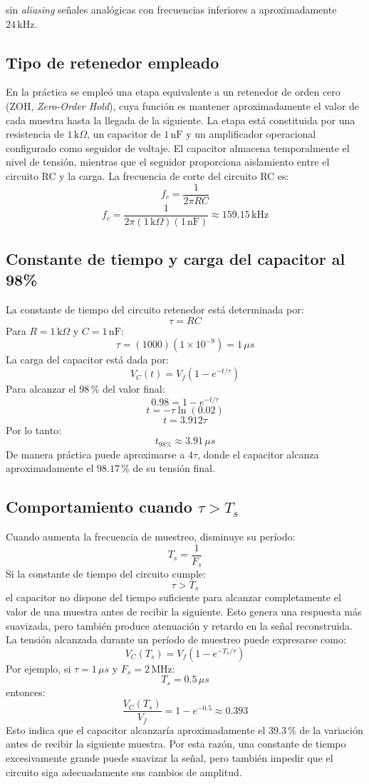 \documentclass[conference]{IEEEtran}
\begin{document}
sin \textit{aliasing} señales analógicas con frecuencias inferiores a aproximadamente $24\,\text{kHz}$. \subsection{Tipo de retenedor empleado} En la práctica se empleó una etapa equivalente a un retenedor de orden cero (ZOH, \textit{Zero-Order Hold}), cuya función es mantener aproximadamente el valor de cada muestra hasta la llegada de la siguiente. La etapa está constituida por una resistencia de $1\,\text{k}\Omega$, un capacitor de $1\,\text{nF}$ y un amplificador operacional configurado como seguidor de voltaje. El capacitor almacena temporalmente el nivel de tensión, mientras que el seguidor proporciona aislamiento entre el circuito RC y la carga. La frecuencia de corte del circuito RC es: \[ f_c=\frac{1}{2\pi RC} \] \[ f_c= \frac{1}{2\pi(1\,\text{k}\Omega)(1\,\text{nF})} \approx159.15\,\text{kHz} \] \subsection{Constante de tiempo y carga del capacitor al 98\%} La constante de tiempo del circuito retenedor está determinada por: \[ \tau=RC \] Para $R=1\,\text{k}\Omega$ y $C=1\,\text{nF}$: \[ \tau=(1000)(1\times10^{-9}) =1\,\mu s \] La carga del capacitor está dada por: \[ V_C(t)=V_f\left(1-e^{-t/\tau}\right) \] Para alcanzar el $98\,\%$ del valor final: \[ 0.98=1-e^{-t/\tau} \] \[ t=-\tau\ln(0.02) \] \[ t=3.912\tau \] Por lo tanto: \[ \boxed{t_{98\%}\approx3.91\,\mu s} \] De manera práctica puede aproximarse a $4\tau$, donde el capacitor alcanza aproximadamente el $98.17\,\%$ de su tensión final. \subsection{Comportamiento cuando $\tau>T_s$} Cuando aumenta la frecuencia de muestreo, disminuye su período: \[ T_s=\frac{1}{F_s} \] Si la constante de tiempo del circuito cumple: \[ \tau>T_s \] el capacitor no dispone del tiempo suficiente para alcanzar completamente el valor de una muestra antes de recibir la siguiente. Esto genera una respuesta más suavizada, pero también produce atenuación y retardo en la señal reconstruida. La tensión alcanzada durante un período de muestreo puede expresarse como: \[ V_C(T_s)=V_f\left(1-e^{-T_s/\tau}\right) \] Por ejemplo, si $\tau=1\,\mu s$ y $F_s=2\,\text{MHz}$: \[ T_s=0.5\,\mu s \] entonces: \[ \frac{V_C(T_s)}{V_f} =1-e^{-0.5} \approx0.393 \] Esto indica que el capacitor alcanzaría aproximadamente el $39.3\,\%$ de la variación antes de recibir la siguiente muestra. Por esta razón, una constante de tiempo excesivamente grande puede suavizar la señal, pero también impedir que el circuito siga adecuadamente sus cambios de amplitud.
\end{document}
